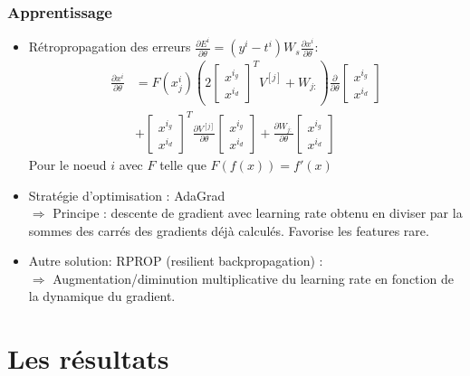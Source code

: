 \documentclass{beamer}
\begin{document}
\begin{frame}
\frametitle{Apprentissage}
\begin{itemize}
\item Rétropropagation des erreurs $\frac{\partial E^i}{\partial \theta} = (y^i-t^i)W_s\frac{\partial{x^i}}{\partial\theta} $:
\begin{align*}
	\frac{\partial{x^i}}{\partial\theta} &=F(x_j^i) \left( 2\begin{bmatrix} x^{i_g} \\ x^{i_d} \end{bmatrix}^T V^{[j]} +W_{j:}\right)\frac{\partial}{\partial\theta}\begin{bmatrix} x^{i_g} \\ x^{i_d} \end{bmatrix}
\\ &+ \begin{bmatrix} x^{i_g} \\ x^{i_d} \end{bmatrix}^T \frac{\partial V^{[j]}}{\partial\theta}\begin{bmatrix} x^{i_g} \\ x^{i_d} \end{bmatrix} + \frac{\partial W_{j:}}{\partial\theta}\begin{bmatrix} x^{i_g} \\ x^{i_d}\end{bmatrix}
\end{align*}
Pour le noeud $i$ avec $F$ telle que $F(f(x))=f'(x)$
\item Stratégie d'optimisation : AdaGrad \\
$\Rightarrow$ Principe : descente de gradient avec learning rate obtenu en diviser par la sommes des carrés des gradients déjà calculés. Favorise les features rare.
\item Autre solution: RPROP (resilient backpropagation) : \\
$\Rightarrow$ Augmentation/diminution multiplicative du learning rate en fonction de la dynamique du gradient.
\end{itemize}
\end{frame}

\section{Les résultats }
\end{document}
